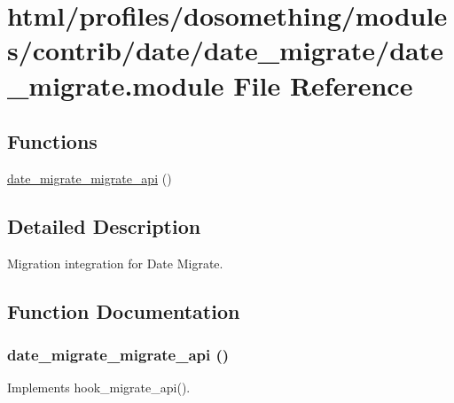 \hypertarget{date__migrate_8module}{
\section{html/profiles/dosomething/modules/contrib/date/date\_\-migrate/date\_\-migrate.module File Reference}
\label{date__migrate_8module}
}
\subsection*{Functions}
\begin{DoxyCompactItemize}
\item 
\hyperlink{date__migrate_8module_aab15b766b77f0379176493865975c20f}{date\_\-migrate\_\-migrate\_\-api} ()
\end{DoxyCompactItemize}


\subsection{Detailed Description}
Migration integration for Date Migrate. 

\subsection{Function Documentation}
\hypertarget{date__migrate_8module_aab15b766b77f0379176493865975c20f}{
\subsubsection[{date\_\-migrate\_\-migrate\_\-api}]{\setlength{\rightskip}{0pt plus 5cm}date\_\-migrate\_\-migrate\_\-api ()}}
\label{date__migrate_8module_aab15b766b77f0379176493865975c20f}
Implements hook\_\-migrate\_\-api(). 